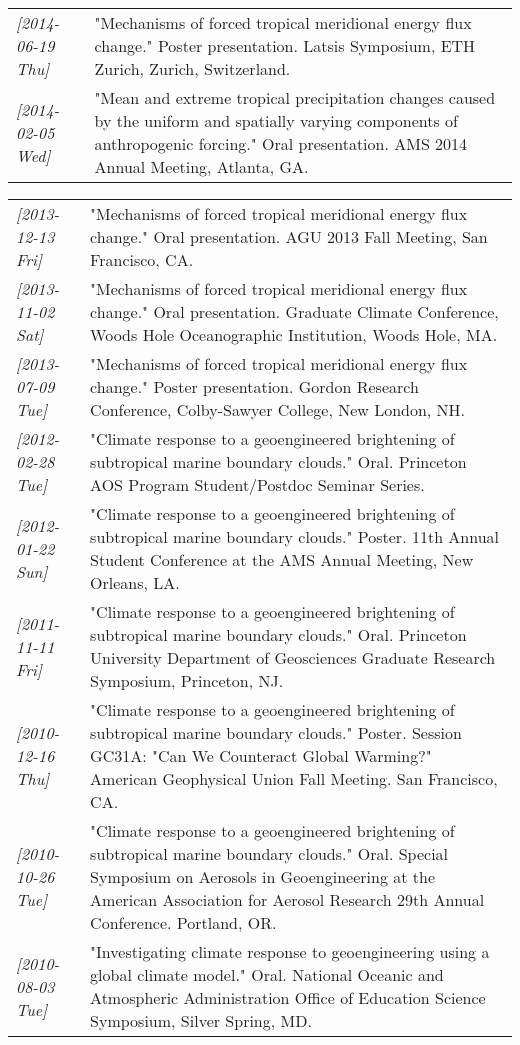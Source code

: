 \documentclass[12pt,letterpaper]{shillcv}
\begin{document}
\begin{center}
\begin{tabularx}{\textwidth}{lX}
\textit{[2014-06-19 Thu]} & "Mechanisms of forced tropical meridional energy flux change."  Poster presentation.  Latsis Symposium, ETH Zurich, Zurich, Switzerland.\\
\textit{[2014-02-05 Wed]} & "Mean and extreme tropical precipitation changes caused by the uniform and spatially varying components of anthropogenic forcing."  Oral presentation.  AMS 2014 Annual Meeting, Atlanta, GA.\\
\end{tabularx}
\end{center}

\begin{center}
\begin{tabularx}{\textwidth}{lX}
\textit{[2013-12-13 Fri]} & "Mechanisms of forced tropical meridional energy flux change."  Oral presentation.  AGU 2013 Fall Meeting, San Francisco, CA.\\
\textit{[2013-11-02 Sat]} & "Mechanisms of forced tropical meridional energy flux change."  Oral presentation.  Graduate Climate Conference, Woods Hole Oceanographic Institution, Woods Hole, MA.\\
\textit{[2013-07-09 Tue]} & "Mechanisms of forced tropical meridional energy flux change."  Poster presentation.  Gordon Research Conference, Colby-Sawyer College, New London, NH.\\
\textit{[2012-02-28 Tue]} & "Climate response to a geoengineered brightening of subtropical marine boundary clouds."  Oral.  Princeton AOS Program Student/Postdoc Seminar Series.\\
\textit{[2012-01-22 Sun]} & "Climate response to a geoengineered brightening of subtropical marine boundary clouds."  Poster.  11th Annual Student Conference at the AMS Annual Meeting, New Orleans, LA.\\
\textit{[2011-11-11 Fri]} & "Climate response to a geoengineered brightening of subtropical marine boundary clouds."  Oral.  Princeton University Department of Geosciences Graduate Research Symposium, Princeton, NJ.\\
\textit{[2010-12-16 Thu]} & "Climate response to a geoengineered brightening of subtropical marine boundary clouds."  Poster.  Session GC31A: "Can We Counteract Global Warming?" American Geophysical Union Fall Meeting.  San Francisco, CA.\\
\textit{[2010-10-26 Tue]} & "Climate response to a geoengineered brightening of subtropical marine boundary clouds."  Oral.  Special Symposium on Aerosols in Geoengineering at the American Association for Aerosol Research 29th Annual Conference.  Portland, OR.\\
\textit{[2010-08-03 Tue]} & "Investigating climate response to geoengineering using a global climate model."  Oral.  National Oceanic and Atmospheric Administration Office of Education Science Symposium, Silver Spring, MD.\\
\end{tabularx}
\end{center}
\end{document}
